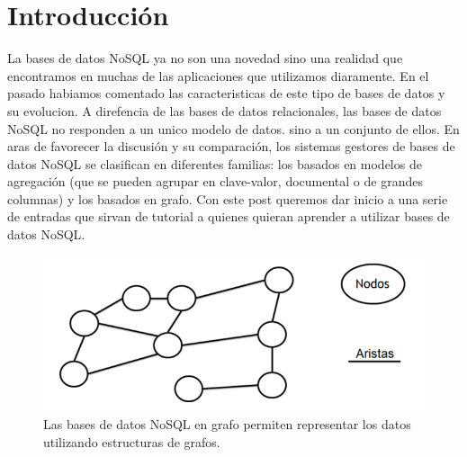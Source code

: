\documentclass[preprint,12pt]{elsarticle}
\begin{document}



\section{Introducción} 

La bases de datos NoSQL ya no son una novedad sino una realidad que encontramos en muchas de las aplicaciones que utilizamos diaramente.
En el pasado habiamos comentado las caracteristicas de este tipo de bases de datos y su evolucion. A direfencia de las bases de datos relacionales, las bases de datos NoSQL no responden a un unico modelo de datos. sino a un conjunto de ellos.
En aras de favorecer la discusión y su comparación, los sistemas gestores de bases de datos NoSQL se clasifican en diferentes familias: los basados en modelos de agregación (que se pueden agrupar en clave-valor, documental o de grandes columnas) y los basados en grafo. Con este post queremos dar inicio a una serie de entradas que sirvan de tutorial a quienes quieran aprender a utilizar bases de datos NoSQL.

\begin{figure}[htb]
	\begin{center}
		\includegraphics[width=14cm]{./IMAGENES/basededatos_2} 
		\caption{Las bases de datos NoSQL en grafo permiten representar los datos utilizando estructuras de grafos.}
	\end{center}
\end{figure}



\end{document}
